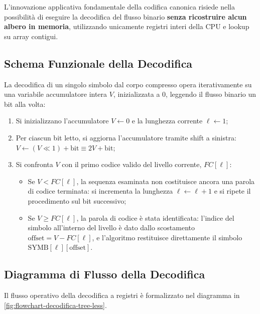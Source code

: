 L'innovazione applicativa fondamentale della codifica canonica risiede nella possibilit\`a di eseguire la decodifica del flusso binario \textbf{senza ricostruire alcun albero in memoria}, utilizzando unicamente registri interi della CPU e lookup su array contigui.

\FloatBarrier
\subsection{Schema Funzionale della Decodifica}
\label{subsec:schema-funzionale-decodifica}

La decodifica di un singolo simbolo dal corpo compresso opera iterativamente su una variabile accumulatore intera $V$, inizializzata a 0, leggendo il flusso binario un bit alla volta:
\begin{enumerate}
  \item Si inizializzano l'accumulatore $V \leftarrow 0$ e la lunghezza corrente $\ell \leftarrow 1$;
  \item Per ciascun bit letto, si aggiorna l'accumulatore tramite shift a sinistra: $V \leftarrow (V \ll 1) + \text{bit} \equiv 2V + \text{bit}$;
  \item Si confronta $V$ con il primo codice valido del livello corrente, $FC[\ell]$:
  \begin{itemize}
    \item Se $V < FC[\ell]$, la sequenza esaminata non costituisce ancora una parola di codice terminata: si incrementa la lunghezza $\ell \leftarrow \ell + 1$ e si ripete il procedimento sul bit successivo;
    \item Se $V \ge FC[\ell]$, la parola di codice \`e stata identificata: l'indice del simbolo all'interno del livello \`e dato dallo scostamento $\text{offset} = V - FC[\ell]$, e l'algoritmo restituisce direttamente il simbolo $\text{SYMB}[\ell][\text{offset}]$.
  \end{itemize}
\end{enumerate}

\FloatBarrier
\subsection{Diagramma di Flusso della Decodifica}
\label{subsec:diagramma-flusso-decodifica}

Il flusso operativo della decodifica a registri \`e formalizzato nel diagramma in \autoref{fig:flowchart-decodifica-tree-less}.

